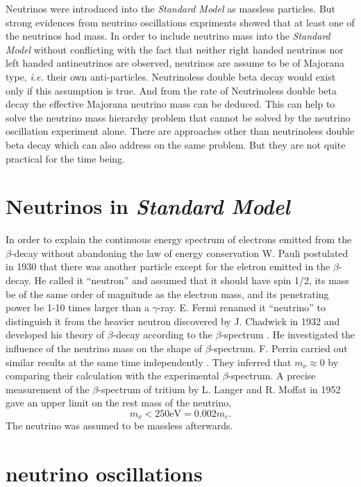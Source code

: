 Neutrinos were introduced into the \emph{Standard Model} as massless
particles. But strong evidences from neutrino oscillations expriments
showed that at least one of the neutrinos had mass. In order to
include neutrino mass into the \emph{Standard Model} without
conflicting with the fact that neither right handed neutrinos nor left
handed antineutrinos are observed, neutrinos are assume to be of
Majorana type, \textit{i.e.} their own anti-particles. Neutrinoless
double beta decay would exist only if this assumption is true. And
from the rate of Neutrinoless double beta decay the effective Majorana
neutrino mass can be deduced. This can help to solve the neutrino mass
hierarchy problem that cannot be solved by the neutrino oscillation
experiment alone. There are approaches other than neutrinoless double
beta decay which can also address on the same problem. But they are
not quite practical for the time being.

\section{Neutrinos in \emph{Standard Model}}
\label{sec:sm}
In order to explain the continuous energy spectrum of electrons
emitted from the $\beta$-decay without abandoning the law of energy
conservation W. Pauli postulated in 1930 that there was another
particle except for the eletron emitted in the $\beta$-decay. He
called it ``neutron'' and assumed that it should have spin 1/2, its
mass be of the same order of magnitude as the electron mass, and its
penetrating power be 1-10 times larger than a $\gamma$-ray.
\cite{Pau30} E. Fermi renamed it ``neutrino'' to distinguish it from
the heavier neutron discovered by J. Chadwick in 1932 and developed
his theory of $\beta$-decay according to the $\beta$-spectrum
\cite{Fer33,Fer34}. He investigated the influence of the neutrino mass
on the shape of $\beta$-spectrum. F. Perrin carried out similar
results at the same time independently \cite{Per33}. They inferred
that $m_\nu \approx 0$ by comparing their calculation with the
experimental $\beta$-spectrum. A precise measurement of the
$\beta$-spectrum of tritium by L. Langer and R. Moffat in 1952
\cite{Lan52} gave an upper limit on the rest mass of the neutrino,
$$m_\nu < 250 \mbox{eV} = 0.002m_e.$$
The neutrino was assumed to be massless afterwards.


\section{neutrino oscillations}
\label{sec:osci}

